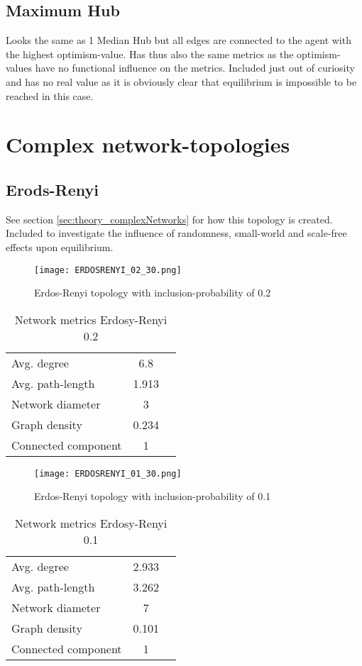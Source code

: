 \documentclass[Bachelorarbeit.tex]{subfiles}
\begin{document}
\subsection{Maximum Hub}
Looks the same as 1 Median Hub but all edges are connected to the agent with the highest optimism-value. Has thus also the same metrics as the optimism-values have no functional influence on the metrics. Included just out of curiosity and has no real value as it is obviously clear that equilibrium is impossible to be reached in this case.

\pagebreak

\section{Complex network-topologies}
\subsection{Erods-Renyi}
See section \ref{sec:theory_complexNetworks} for how this topology is created. Included to investigate the influence of randomness, small-world and scale-free effects upon equilibrium.

\begin{figure}[H]
	\centering
  \texttt{[image: ERDOSRENYI\_02\_30.png]}
	\caption{Erdos-Renyi topology with inclusion-probability of 0.2}
	\label{fig:topology_ERDOSRENYI_02_30}
\end{figure}

\begin{table}[H]
	\centering
	\caption{Network metrics Erdosy-Renyi 0.2}
	\begin{tabular} { l c r }
		\hline
		Avg. degree & 6.8 \\
		Avg. path-length & 1.913 \\
		Network diameter & 3 \\
		Graph density & 0.234 \\
		Connected component & 1 \\
		\hline
	\end{tabular}
\end{table}

\begin{figure}[H]
	\centering
  \texttt{[image: ERDOSRENYI\_01\_30.png]}
	\caption{Erdos-Renyi topology with inclusion-probability of 0.1}
	\label{fig:topology_ERDOSRENYI_01_30}
\end{figure}

\begin{table}[H]
	\centering
	\caption{Network metrics Erdosy-Renyi 0.1}
	\begin{tabular} { l c r }
		\hline
		Avg. degree & 2.933 \\
		Avg. path-length & 3.262 \\
		Network diameter & 7 \\
		Graph density & 0.101 \\
		Connected component & 1 \\
		\hline
	\end{tabular}
\end{table}
\end{document}
